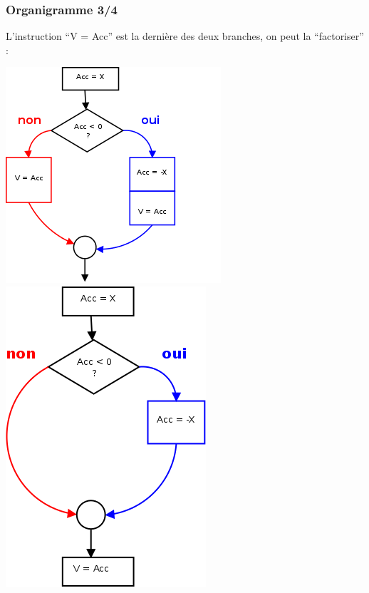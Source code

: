 \begin{frame}
  \frametitle{Organigramme 3/4 }
L'instruction ``V = Acc'' est la dernière des deux branches, on peut la ``factoriser'' :
  \begin{multicols}{2}
\includegraphics[width=\linewidth]{figures/val-abs-2}    
\break
\includegraphics[width=0.8\linewidth]{figures/val-abs-3}    
  \end{multicols}
\end{frame}

